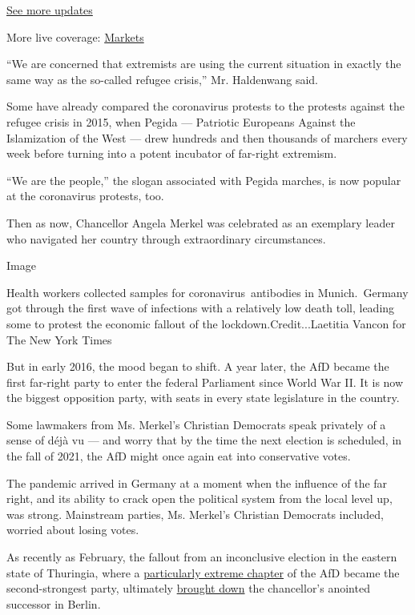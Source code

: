 \href{https://www.nytimes.com/2020/08/01/world/coronavirus-covid-19.html?action=click\&pgtype=Article\&state=default\&region=MAIN_CONTENT_1\&context=storylines_live_updates}{See
more updates}

More live coverage:
\href{https://www.nytimes.com/live/2020/07/31/business/stock-market-today-coronavirus?action=click\&pgtype=Article\&state=default\&region=MAIN_CONTENT_1\&context=storylines_live_updates}{Markets}

``We are concerned that extremists are using the current situation in
exactly the same way as the so-called refugee crisis,'' Mr. Haldenwang
said.

Some have already compared the coronavirus protests to the protests
against the refugee crisis in 2015, when Pegida --- Patriotic Europeans
Against the Islamization of the West --- drew hundreds and then
thousands of marchers every week before turning into a potent incubator
of far-right extremism.

``We are the people,'' the slogan associated with Pegida marches, is now
popular at the coronavirus protests, too.

Then as now, Chancellor Angela Merkel was celebrated as an exemplary
leader who navigated her country through extraordinary circumstances.

Image

Health workers collected samples for coronavirus~antibodies in
Munich.~Germany got through the first wave of infections with a
relatively low death toll, leading some to protest the economic fallout
of the lockdown.Credit...Laetitia Vancon for The New York Times

But in early 2016, the mood began to shift. A year later, the AfD became
the first far-right party to enter the federal Parliament since World
War II. It is now the biggest opposition party, with seats in every
state legislature in the country.

Some lawmakers from Ms. Merkel's Christian Democrats speak privately of
a sense of déjà vu --- and worry that by the time the next election is
scheduled, in the fall of 2021, the AfD might once again eat into
conservative votes.

The pandemic arrived in Germany at a moment when the influence of the
far right, and its ability to crack open the political system from the
local level up, was strong. Mainstream parties, Ms. Merkel's Christian
Democrats included, worried about losing votes.

As recently as February, the fallout from an inconclusive election in
the eastern state of Thuringia, where a
\href{https://www.nytimes.com/2019/10/26/world/europe/afd-election-east-germany-hoecke.html}{particularly
extreme chapter} of the AfD became the second-strongest party,
ultimately
\href{https://www.nytimes.com/2020/02/10/world/europe/annegret-kramp-karrenbauer-resign.html}{brought
down} the chancellor's anointed successor in Berlin.

